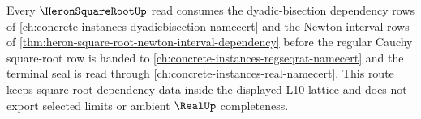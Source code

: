 Every $\HeronSquareRootUp$ read consumes the dyadic-bisection dependency rows of \autoref{ch:concrete-instances-dyadicbisection-namecert} and the Newton interval rows of \autoref{thm:heron-square-root-newton-interval-dependency} before the regular Cauchy square-root row is handed to \autoref{ch:concrete-instances-regseqrat-namecert} and the terminal seal is read through \autoref{ch:concrete-instances-real-namecert}. This route keeps square-root dependency data inside the displayed L10 lattice and does not export selected limits or ambient $\RealUp$ completeness.
